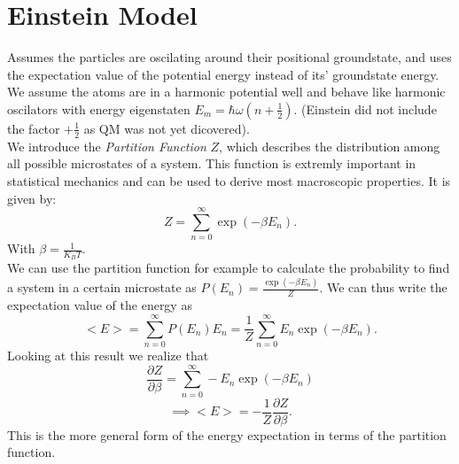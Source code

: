 \documentclass{report}
\begin{document}
\section{Einstein Model}
Assumes the particles are oscilating around their positional groundstate, and uses the expectation value of the potential energy instead of its' groundstate energy.\\
We assume the atoms are in a harmonic potential well and behave like harmonic oscilators with energy eigenstaten $E_m = \hbar \omega \left( n + \frac{1}{2} \right) $. (Einstein did not include the factor $+ \frac{1}{2}$ as QM was not yet dicovered). \\
We introduce the \emph{Partition Function} $Z$, which describes the distribution among all possible microstates of a system. This function is extremly important in statistical mechanics and can be used to derive most macroscopic properties. It is given by: \[
	Z = \sum_{n=0}^{\infty} \exp\left( -\beta E_n \right) 
.\] With $\beta = \frac{1}{K_BT}$. \\
We can use the partition function for example to calculate the probability to find a system in a certain microstate as $P(E_n) = \frac{\exp\left( -\beta E_n \right)}{Z} $. We can thus write the expectation value of the energy as \[
	<E> = \sum_{n=0}^{\infty} P\left( E_n \right) E_n = \frac{1}{Z} \sum_{n=0}^{\infty} E_n \exp\left( -\beta E_n \right) 
.\] Looking at this result we realize that \[
\frac{\partial Z}{\partial \beta} = \sum_{n=0}^{\infty} -E_n \exp\left( -\beta E_n \right) 
\] \[
\implies <E> = -\frac{1}{Z} \frac{\partial Z}{\partial \beta}
.\] This is the more general form of the energy expectation in terms of the partition function. \\
\end{document}
